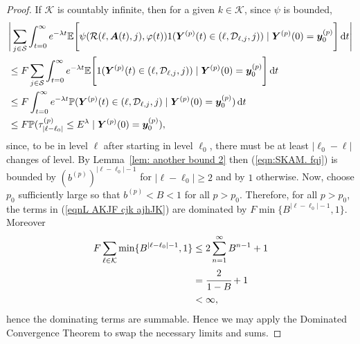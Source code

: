 \begin{proof}
	If \(\mathcal K\) is countably infinite, then for a given \(k\in\mathcal K\), since \(\psi\) is bounded,
	\begin{align}
		&\Bigg|\sum_{j\in\mathcal S}\int_{t=0}^\infty e^{-\lambda t}\mathbb E\Bigg[\psi( \mathcal R(\ell,\boldsymbol A(t),j),\varphi(t) )  1({\boldsymbol Y}^{(p)}(t)\in(\ell,\mathcal D_{\ell,j},j))  \mid \nonumber
		\boldsymbol Y^{(p)}(0)=\boldsymbol y_0^{(p)} \Bigg] \, \mathrm{d} t\Bigg| \nonumber 
		\\&\leq F \sum_{j\in\mathcal S}\int_{t=0}^\infty e^{-\lambda t}\mathbb E\Bigg[1({\boldsymbol Y}^{(p)}(t)\in(\ell,\mathcal D_{\ell,j},j))  \mid \nonumber
		\boldsymbol Y^{(p)}(0)=\boldsymbol y_0^{(p)}\Bigg] \, \mathrm{d} t \nonumber 
		\\&\leq F  \int_{t=0}^\infty e^{-\lambda t}\mathbb P( {\boldsymbol Y}^{(p)}(t)\in(\ell,\mathcal D_{\ell,j},j) \mid   
		\boldsymbol Y^{(p)}(0)=\boldsymbol y_0^{(p)})\, \mathrm{d} t \nonumber 
		\\&\leq F \mathbb P(\tau_{|\ell-\ell_0|}^{(p)}\leq E^\lambda \mid
			\boldsymbol Y^{(p)}(0)=\boldsymbol y_0^{(p)}), \label{eqn:SKAM. fqj}
	\end{align}
	since, to be in level \(\ell\) after starting in level \(\ell_0\), there must be at least \(|\ell_0-\ell|\) changes of level. By Lemma~\ref{lem: another bound 2} then (\ref{eqn:SKAM. fqj}) is bounded by \(\left(b^{(p)}\right)^{|\ell-\ell_0|-1}\) for \(|\ell-\ell_0|\geq 2\) and by \(1\) otherwise. Now, choose \(p_0\) sufficiently large so that \(b^{(p)}<B<1\) for all \(p>p_0\). Therefore, for all \(p>p_0\), the terms in (\ref{eqnL AKJF cjk ajhJK}) are dominated by \(F\min\{B^{|\ell-\ell_0|-1},1\}\). Moreover 
	\begin{align*}
		F\sum_{\ell\in\mathcal K} \min\{B^{|\ell-\ell_0|-1},1\} 
		&\leq2\sum_{n=1}^\infty B^{n-1}+1
		\\&=\cfrac{2}{1-B}+1
		\\&<\infty,
	\end{align*}
	hence the dominating terms are summable. Hence we may apply the Dominated Convergence Theorem to swap the necessary limits and sums. 
\end{proof} 

